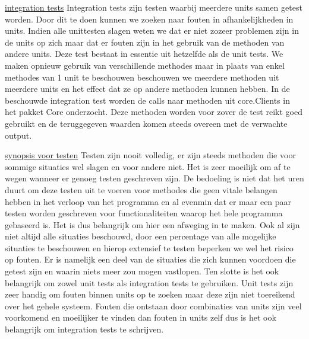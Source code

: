 \documentclass{article}
\begin{document}
\newpage
\maketitle
\noindent
\underline{integration tests}\newline
\newline
Integration tests zijn testen waarbij meerdere units samen getest worden. Door dit te doen kunnen we zoeken naar fouten in afhankelijkheden in units. Indien alle unittesten slagen weten we dat er niet zozeer problemen zijn in de units op zich maar dat er fouten zijn in het gebruik van de methoden van andere units.\newline
\newline
Deze test bestaat in essentie uit hetzelfde als de unit tests. We maken opnieuw gebruik van verschillende methodes maar in plaats van enkel methodes van 1 unit te beschouwen beschouwen we meerdere methoden uit meerdere units en het effect dat ze op andere methoden kunnen hebben. \newline
\newline
In de beschouwde integration test worden de calls naar methoden uit core.Clients in het pakket Core onderzocht. Deze methoden worden voor zover de test reikt goed gebruikt en de teruggegeven waarden komen steeds overeen met de verwachte output.\newline
\newline
\maketitle
\noindent
\underline{synopsis voor testen}\newline
\newline
Testen zijn nooit volledig, er zijn steeds methoden die voor sommige situaties wel slagen en voor andere niet. Het is zeer moeilijk om af te wegen wanneer er genoeg testen geschreven zijn. De bedoeling is niet dat het uren duurt om deze testen uit te voeren voor methodes die geen vitale belangen hebben in het verloop van het programma en al evenmin dat er maar een paar testen worden geschreven voor functionaliteiten waarop het hele programma gebaseerd is. Het is dus belangrijk om hier een afweging in te maken.\newline
\newline
Ook al zijn niet altijd alle situaties beschouwd, door een percentage van alle mogelijke situaties te beschouwen en hierop extensief te testen beperken we wel het risico op fouten. Er is namelijk een deel van de situaties die zich kunnen voordoen die getest zijn en waarin niets meer zou mogen vastlopen. \newline
\newline
Ten slotte is het ook belangrijk om zowel unit tests als integration tests te gebruiken. Unit tests zijn zeer handig om fouten binnen units op te zoeken maar deze zijn niet toereikend over het gehele systeem. Fouten die ontstaan door combinaties van units zijn veel voorkomend en moeilijker te vinden dan fouten in units zelf dus is het ook belangrijk om integration tests te schrijven.
\end{document}
